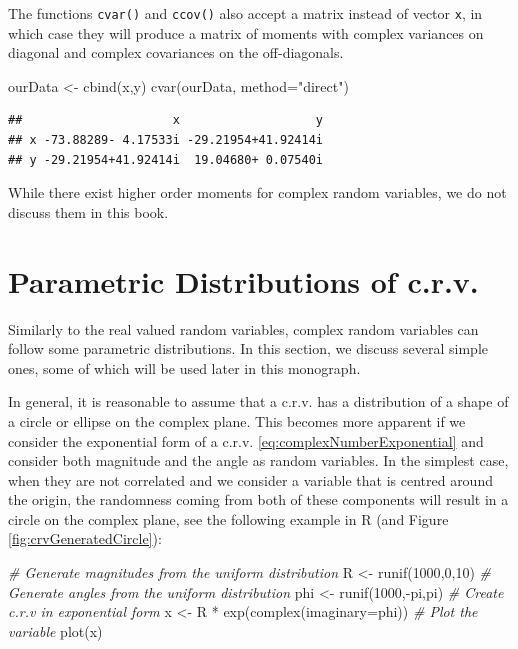 \documentclass[
]{book}
\newenvironment{Shaded}{\begin{snugshade}}{\end{snugshade}}
\newcommand{\AttributeTok}[1]{\textcolor[rgb]{0.77,0.63,0.00}{#1}}
\newcommand{\CommentTok}[1]{\textcolor[rgb]{0.56,0.35,0.01}{\textit{#1}}}
\newcommand{\DecValTok}[1]{\textcolor[rgb]{0.00,0.00,0.81}{#1}}
\newcommand{\FunctionTok}[1]{\textcolor[rgb]{0.00,0.00,0.00}{#1}}
\newcommand{\NormalTok}[1]{#1}
\newcommand{\OtherTok}[1]{\textcolor[rgb]{0.56,0.35,0.01}{#1}}
\newcommand{\SpecialCharTok}[1]{\textcolor[rgb]{0.00,0.00,0.00}{#1}}
\newcommand{\StringTok}[1]{\textcolor[rgb]{0.31,0.60,0.02}{#1}}
\begin{document}
The functions \texttt{cvar()} and \texttt{ccov()} also accept a matrix instead of vector \texttt{x}, in which case they will produce a matrix of moments with complex variances on diagonal and complex covariances on the off-diagonals.

\begin{Shaded}
\begin{Highlighting}[]
\NormalTok{ourData }\OtherTok{\textless{}{-}} \FunctionTok{cbind}\NormalTok{(x,y)}
\FunctionTok{cvar}\NormalTok{(ourData, }\AttributeTok{method=}\StringTok{"direct"}\NormalTok{)}
\end{Highlighting}
\end{Shaded}

\begin{verbatim}
##                     x                   y
## x -73.88289- 4.17533i -29.21954+41.92414i
## y -29.21954+41.92414i  19.04680+ 0.07540i
\end{verbatim}

While there exist higher order moments for complex random variables, we do not discuss them in this book.

\hypertarget{parametric-distributions-of-c.r.v.}{%
\section{Parametric Distributions of c.r.v.}\label{parametric-distributions-of-c.r.v.}}

Similarly to the real valued random variables, complex random variables can follow some parametric distributions. In this section, we discuss several simple ones, some of which will be used later in this monograph.

In general, it is reasonable to assume that a c.r.v. has a distribution of a shape of a circle or ellipse on the complex plane. This becomes more apparent if we consider the exponential form of a c.r.v. \eqref{eq:complexNumberExponential} and consider both magnitude and the angle as random variables. In the simplest case, when they are not correlated and we consider a variable that is centred around the origin, the randomness coming from both of these components will result in a circle on the complex plane, see the following example in R (and Figure \ref{fig:crvGeneratedCircle}):

\begin{Shaded}
\begin{Highlighting}[]
\CommentTok{\# Generate magnitudes from the uniform distribution}
\NormalTok{R }\OtherTok{\textless{}{-}} \FunctionTok{runif}\NormalTok{(}\DecValTok{1000}\NormalTok{,}\DecValTok{0}\NormalTok{,}\DecValTok{10}\NormalTok{)}
\CommentTok{\# Generate angles from the uniform distribution}
\NormalTok{phi }\OtherTok{\textless{}{-}} \FunctionTok{runif}\NormalTok{(}\DecValTok{1000}\NormalTok{,}\SpecialCharTok{{-}}\NormalTok{pi,pi)}
\CommentTok{\# Create c.r.v in exponential form}
\NormalTok{x }\OtherTok{\textless{}{-}}\NormalTok{ R }\SpecialCharTok{*} \FunctionTok{exp}\NormalTok{(}\FunctionTok{complex}\NormalTok{(}\AttributeTok{imaginary=}\NormalTok{phi))}
\CommentTok{\# Plot the variable}
\FunctionTok{plot}\NormalTok{(x)}
\end{Highlighting}
\end{Shaded}
\end{document}
